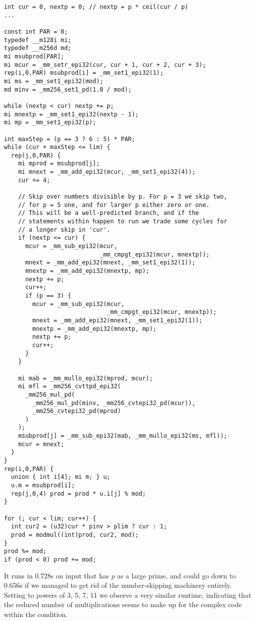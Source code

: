 \begin{lstlisting}
int cur = 0, nextp = 0; // nextp = p * ceil(cur / p)
...

const int PAR = 8;
typedef __m128i mi;
typedef __m256d md;
mi msubprod[PAR];
mi mcur = _mm_setr_epi32(cur, cur + 1, cur + 2, cur + 3);
rep(i,0,PAR) msubprod[i] = _mm_set1_epi32(1);
mi ms = _mm_set1_epi32(mod);
md minv = _mm256_set1_pd(1.0 / mod);

while (nextp < cur) nextp += p;
mi mnextp = _mm_set1_epi32(nextp - 1);
mi mp = _mm_set1_epi32(p);

int maxStep = (p == 3 ? 6 : 5) * PAR;
while (cur + maxStep <= lim) {
  rep(j,0,PAR) {
    mi mprod = msubprod[j];
    mi mnext = _mm_add_epi32(mcur, _mm_set1_epi32(4));
    cur += 4;

    // Skip over numbers divisible by p. For p = 3 we skip two,
    // for p = 5 one, and for larger p either zero or one.
    // This will be a well-predicted branch, and if the
    // statements within happen to run we trade some cycles for
    // a longer skip in 'cur'.
    if (nextp <= cur) {
      mcur = _mm_sub_epi32(mcur,
                           _mm_cmpgt_epi32(mcur, mnextp));
      mnext = _mm_add_epi32(mnext, _mm_set1_epi32(1));
      mnextp = _mm_add_epi32(mnextp, mp);
      nextp += p;
      cur++;
      if (p == 3) {
        mcur = _mm_sub_epi32(mcur,
                             _mm_cmpgt_epi32(mcur, mnextp));
        mnext = _mm_add_epi32(mnext, _mm_set1_epi32(1));
        mnextp = _mm_add_epi32(mnextp, mp);
        nextp += p;
        cur++;
      }
    }

    mi mab = _mm_mullo_epi32(mprod, mcur);
    mi mfl = _mm256_cvttpd_epi32(
      _mm256_mul_pd(
        _mm256_mul_pd(minv, _mm256_cvtepi32_pd(mcur)),
        _mm256_cvtepi32_pd(mprod)
      )
    );
    msubprod[j] = _mm_sub_epi32(mab, _mm_mullo_epi32(ms, mfl));
    mcur = mnext;
  }
}
rep(i,0,PAR) {
  union { int i[4]; mi m; } u;
  u.m = msubprod[i];
  rep(j,0,4) prod = prod * u.i[j] % mod;
}

for (; cur < lim; cur++) {
  int cur2 = (u32)cur * pinv > plim ? cur : 1;
  prod = modmul((int)prod, cur2, mod);
}
prod %= mod;
if (prod < 0) prod += mod;
\end{lstlisting}

It runs in 0.728s on input that has $p$ as a large prime,
and could go down to 0.656s if we managed to get rid of the number-skipping machinery entirely.
Setting \verb@mod@ to powers of 3, 5, 7, 11 we observe a very similar runtime, indicating that the reduced number of multiplications seems to make up for the complex code within the condition.

